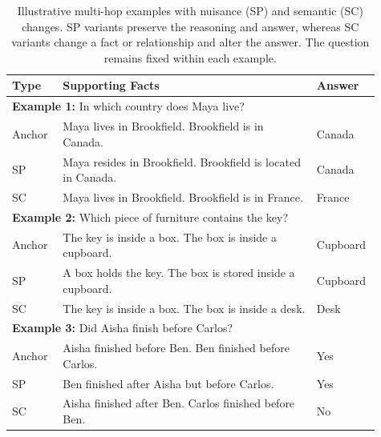 \begin{table}[!htbp]
\centering
\small
\begin{tabular}{p{0.13\linewidth} p{0.65\linewidth} p{0.13\linewidth}}
\toprule
Type & Supporting Facts & Answer \\
\midrule
\multicolumn{3}{p{0.95\linewidth}}{
\textbf{Example 1:} In which country does Maya live?} \\
Anchor &
Maya lives in Brookfield. Brookfield is in Canada. &
Canada \\
SP &
Maya resides in Brookfield. Brookfield is located in Canada. &
Canada \\
SC &
Maya lives in Brookfield. Brookfield is in France. &
France \\
\midrule
\multicolumn{3}{p{0.95\linewidth}}{
\textbf{Example 2:} Which piece of furniture contains the key?} \\
Anchor &
The key is inside a box. The box is inside a cupboard. &
Cupboard \\
SP &
A box holds the key. The box is stored inside a cupboard. &
Cupboard \\
SC &
The key is inside a box. The box is inside a desk. &
Desk \\
\midrule
\multicolumn{3}{p{0.95\linewidth}}{
\textbf{Example 3:} Did Aisha finish before Carlos?} \\
Anchor &
Aisha finished before Ben. Ben finished before Carlos. &
Yes \\
SP &
Ben finished after Aisha but before Carlos. &
Yes \\
SC &
Aisha finished after Ben. Carlos finished before Ben. &
No \\
\bottomrule
\end{tabular}
\vspace{0.4em}
\caption{Illustrative multi-hop examples with nuisance (SP) and semantic (SC) changes. SP variants preserve the reasoning and answer, whereas SC variants change a fact or relationship and alter the answer. The question remains fixed within each example.}
\label{tab:multihop_perturbation_examples}
\vspace{-1.0em}
\end{table}

